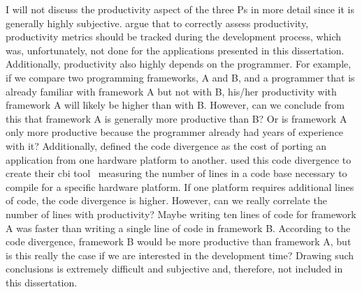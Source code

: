 I will not discuss the productivity aspect of the three Ps in more detail since it is generally highly subjective. 
\citet{harrell_effective_2018} argue that to correctly assess productivity, productivity metrics should be tracked during the development process, which was, unfortunately, not done for the applications presented in this dissertation. 
Additionally, productivity also highly depends on the programmer. 
For example, if we compare two programming frameworks, A and B, and a programmer that is already familiar with framework A but not with B, his/her productivity with framework A will likely be higher than with B. 
However, can we conclude from this that framework A is generally more productive than B? 
Or is framework A only more productive because the programmer already had years of experience with it? 
Additionally, \citet{harrell_effective_2018} defined the code divergence as the cost of porting an application from one hardware platform to another. 
\citet{pennycook_navigating_2021} used this code divergence to create their \gls{cbi} tool~\cite{sewall_code_2024} measuring the number of lines in a code base necessary to compile for a specific hardware platform. 
If one platform requires additional lines of code, the code divergence is higher. 
However, can we really correlate the number of lines with productivity? 
Maybe writing ten lines of code for framework A was faster than writing a single line of code in framework B. 
According to the code divergence, framework B would be more productive than framework A, but is this really the case if we are interested in the development time?
Drawing such conclusions is extremely difficult and subjective and, therefore, not included in this dissertation. 






